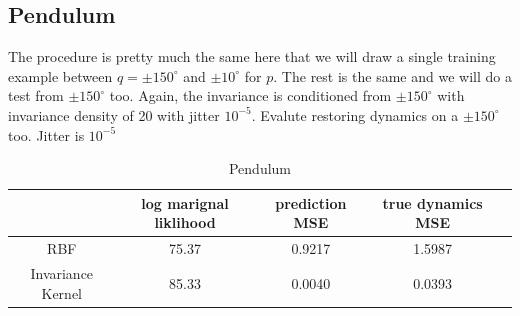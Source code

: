 \documentclass{statsmsc}
\begin{document}
\subsection{Pendulum}
The procedure is pretty much the same here that we will draw a single training example between $q=\pm 150^{\circ}$ and $\pm 10^{\circ}$ for $p$.
The rest is the same and we will do a test from $\pm 150^{\circ}$ too.
Again, the invariance is conditioned from $\pm 150^{\circ}$ with invariance density of 20 with jitter $10^{-5}$.
Evalute restoring dynamics on a $\pm 150^{\circ}$ too.
Jitter is $10^{-5}$
\begin{table}[H]
  \centering
  \begin{tabular}{ c c c c c}
    \hline
                    & log marignal liklihood &  prediction MSE & true dynamics MSE\\
                    \hline
RBF & 75.37 & 0.9217 & 1.5987 \\
Invariance Kernel & 85.33 & 0.0040 & 0.0393 \\
    \hline
  \end{tabular}
  \caption{Pendulum }
  \label{tab:pendulum_performance}
\end{table}
\end{document}

